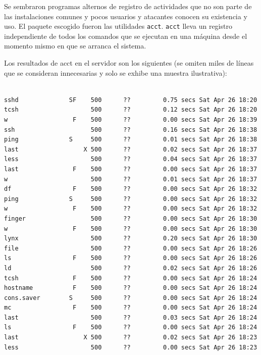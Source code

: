 Se sembraron programas alternos de registro de
actividades que no son parte de las instalaciones comunes y pocos
usuarios y atacantes conocen su existencia y uso. El paquete escogido
fueron las utilidades \texttt{acct}. \texttt{acct} lleva un registro independiente de
todos los comandos que se ejecutan en una máquina desde el momento
mismo en que se arranca el sistema.

Los resultados de acct en el servidor son los siguientes (se omiten
miles de líneas que se consideran innecesarias y solo se exhibe una
muestra ilustrativa):

\vspace{1em}

\begin{lstlisting}[style=terminal]

sshd              SF    500      ??         0.75 secs Sat Apr 26 18:20
tcsh                    500      ??         0.12 secs Sat Apr 26 18:20
w                  F    500      ??         0.00 secs Sat Apr 26 18:39
ssh                     500      ??         0.16 secs Sat Apr 26 18:38
ping              S     500      ??         0.01 secs Sat Apr 26 18:38
last                  X 500      ??         0.02 secs Sat Apr 26 18:37
less                    500      ??         0.04 secs Sat Apr 26 18:37
last               F    500      ??         0.00 secs Sat Apr 26 18:37
w                       500      ??         0.01 secs Sat Apr 26 18:37
df                 F    500      ??         0.00 secs Sat Apr 26 18:32
ping              S     500      ??         0.00 secs Sat Apr 26 18:32
w                  F    500      ??         0.00 secs Sat Apr 26 18:32
finger                  500      ??         0.00 secs Sat Apr 26 18:30
w                  F    500      ??         0.00 secs Sat Apr 26 18:30
lynx                    500      ??         0.20 secs Sat Apr 26 18:30
file                    500      ??         0.00 secs Sat Apr 26 18:26
ls                 F    500      ??         0.00 secs Sat Apr 26 18:26
ld                      500      ??         0.02 secs Sat Apr 26 18:26
tcsh               F    500      ??         0.00 secs Sat Apr 26 18:24
hostname           F    500      ??         0.00 secs Sat Apr 26 18:24
cons.saver        S     500      ??         0.00 secs Sat Apr 26 18:24
mc                 F    500      ??         0.00 secs Sat Apr 26 18:24
last                    500      ??         0.03 secs Sat Apr 26 18:24
ls                 F    500      ??         0.00 secs Sat Apr 26 18:24
last                  X 500      ??         0.02 secs Sat Apr 26 18:23
less                    500      ??         0.00 secs Sat Apr 26 18:23

\end{lstlisting}
